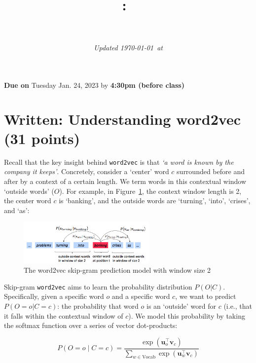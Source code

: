 \documentclass{article}
\title{
\vspace{-1in}
\textmd{\textbf{\hmwkClass:\ \hmwkTitle} \\ \hmwkAuthorName}\\
}
\author{}
\date{\textit{\small Updated \today\ at \currenttime}} %
\date{}
\begin{document}
\maketitle
\vspace{-.7in}

\begin{center}
    \large{\textbf{Due on} Tuesday Jan. 24, 2023 by \textbf{4:30pm (before class)}}
\end{center}

\section{Written: Understanding word2vec (31 points)}
Recall that the key insight behind {\tt word2vec} is that \textit{`a word is known by the company it keeps'}. Concretely, consider a `center' word $c$ surrounded before and after by a context of a certain length. We term words in this contextual window `outside words' ($O$). For example, in Figure~\ref{fig:word2vec}, the context window length is 2, the center word $c$ is `banking', and the outside words are `turning', `into', `crises', and `as':

\begin{figure}[h]
    \centering
    \includegraphics[width=0.6\textwidth]{word2vec.png}
    \caption{The word2vec skip-gram prediction model with window size 2}
    \label{fig:word2vec}
\end{figure}

Skip-gram {\tt word2vec} aims to learn the probability distribution $P(O|C)$. 
Specifically, given a specific word $o$ and a specific word $c$, we want to predict $P(O=o|C=c)$: the probability that word $o$ is an `outside' word for $c$ (i.e., that it falls within the contextual window of $c$).
We model this probability by taking the softmax function over a series of vector dot-products: %

\begin{equation}
 P(O=o \mid C=c) = \frac{\exp(\bm u_{o}^\top \bm v_c)}{\sum_{w \in \text{Vocab}} \exp(\bm u_{w}^\top \bm v_c)}
 \label{word2vec_condprob}
\end{equation}
\end{document}
